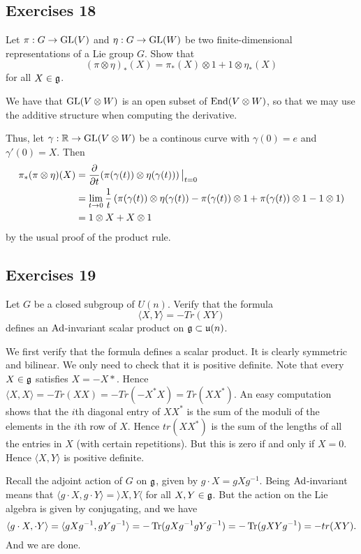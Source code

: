 \documentclass[11pt, english]{article}
\begin{document}
\subsection{Exercises 18}

\begin{exc}[Exc 2]
Let $\pi:G \to \operatorname{GL}(V)$ and $\eta:G \to \operatorname{GL}(W)$ be two finite-dimensional representations of a Lie group $G$. Show that 
$$
(\pi \otimes \eta)_\ast(X) = \pi_\ast(X) \otimes 1 + 1 \otimes \eta_\ast(X)
$$
for all $X \in \frak g$.
\end{exc}

\begin{sol}
We have that $\operatorname{GL}(V \otimes W)$ is an open subset of $\operatorname{End}(V \otimes W)$, so that we may use the additive structure when computing the derivative.

Thus, let $\gamma:\mathbb{R} \to \operatorname{GL}(V \otimes W)$ be a continous curve with $\gamma(0)=e$ and $\gamma'(0)=X$. Then
\begin{align*}
  \pi_\ast(\pi \otimes \eta)(X) &= \dd{}{t}\restr{\left(
\pi(\gamma(t)) \otimes\eta(\gamma(t))
\right)}{t = 0} \\
&= \lim_{t \to 0} \frac 1t \left( \pi(\gamma(t)) \otimes \eta(\gamma(t)) - \pi(\gamma(t)) \otimes 1 + \pi(\gamma(t)) \otimes 1 - 1 \otimes 1 \right)\\
&= 1 \otimes X + X \otimes 1
\end{align*}
by the usual proof of the product rule.
\end{sol}

\subsection{Exercises 19}

\begin{exc}[Exercise 3]
Let $G$ be a closed subgroup of $U(n)$. Verify that the formula
$$
\langle X,Y \rangle = -Tr(XY)
$$  
defines an $\operatorname{Ad}$-invariant scalar product on $\mathfrak g \subset \mathfrak u(n)$.
\end{exc}
\begin{sol}
We first verify that the formula defines a scalar product. It is clearly symmetric and bilinear. We only need to check that it is positive definite. Note that every $X \in \mathfrak g$ satisfies $X = -X*$. Hence $\langle X,X \rangle  = -Tr(XX)=-Tr(-X^\ast X)=Tr(XX^\ast)$. An easy computation shows that the $i$th diagonal entry of $XX^\ast$ is the sum of the moduli of the elements in the $i$th row of $X$. Hence $tr(XX^\ast)$ is the sum of the lengths of all the entries in $X$ (with certain repetitions). But this is zero if and only if $X=0$. Hence $\langle X,Y \rangle$ is positive definite.

Recall the adjoint action of $G$ on $\mathfrak g$, given by $g \cdot X = gXg^{-1}$. Being $\operatorname{Ad}$-invariant means that $\langle g \cdot X, g \cdot Y \rangle = \rangle X,Y \langle$ for all $X,Y \in \mathfrak g$. But the action on the Lie algebra is given by conjugating, and we have
$$
\langle g \cdot X, \cdot Y \rangle = \langle gXg^{-1},gYg^{-1}\rangle = -\operatorname{Tr}(gXg^{-1}gYg^{-1}) = -\operatorname{Tr}(gXYg^{-1})=-tr(XY).
$$
And we are done.
\end{sol}
\end{document}
